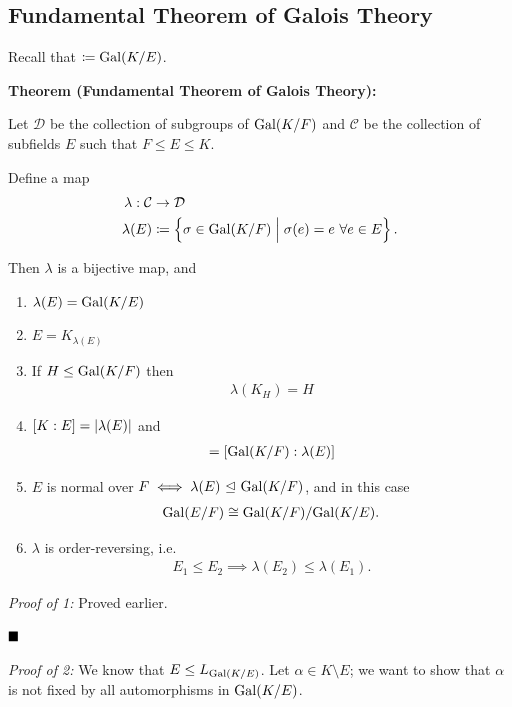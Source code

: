 \hypertarget{fundamental-theorem-of-galois-theory}{%
\subsection{Fundamental Theorem of Galois
Theory}\label{fundamental-theorem-of-galois-theory}}

Recall that \(\coloneqq \mathrm{Gal}(K/E)\).

\textbf{Theorem (Fundamental Theorem of Galois Theory):}

Let \(\mathcal D\) be the collection of subgroups of \(\mathrm{Gal}(K/F)\) and
\(\mathcal C\) be the collection of subfields \(E\) such that
\(F \leq E \leq K\).

Define a map \begin{align*}
\lambda: \mathcal C &\to \mathcal D \\
\lambda(E) &\coloneqq \left\{{\sigma \in \mathrm{Gal}(K/F) \mathrel{\Big|} \sigma(e) = e ~\forall e\in E}\right\}
.\end{align*}

Then \(\lambda\) is a bijective map, and

\begin{enumerate}
\def\labelenumi{\arabic{enumi}.}
\item
  \(\lambda(E) = \mathrm{Gal}(K/E)\)
\item
  \(E = K_{\lambda(E)}\)
\item
  If \(H \leq \mathrm{Gal}(K/F)\) then
  \begin{align*}
  \lambda(K_H) = H
  \end{align*}
\item
  \([K: E] = {\left\lvert {\lambda(E)} \right\rvert}\) and
  \begin{align*}
  [E: F] = [\Gal(K/F): \lambda(E)]
  \end{align*}
\item
  \(E\) is normal over \(F \iff \lambda(E) {~\trianglelefteq~} \mathrm{Gal}(K/F)\), and in
  this case
  \begin{align*}
  \mathrm{Gal}(E/F) \cong \mathrm{Gal}(K/F) / \mathrm{Gal}(K/E)
  .\end{align*}
\item
  \(\lambda\) is order-reversing, i.e.~
  \begin{align*}
  E_1 \leq E_2 \implies \lambda(E_2) \leq \lambda(E_1)
  .\end{align*}
\end{enumerate}

\emph{Proof of 1:} Proved earlier.

\(\qed\)

\emph{Proof of 2:} We know that \(E \leq L_{\mathrm{Gal}(K/E)}\). Let
\(\alpha \in K\setminus E\); we want to show that \(\alpha\) is not
fixed by all automorphisms in \(\mathrm{Gal}(K/E)\).

